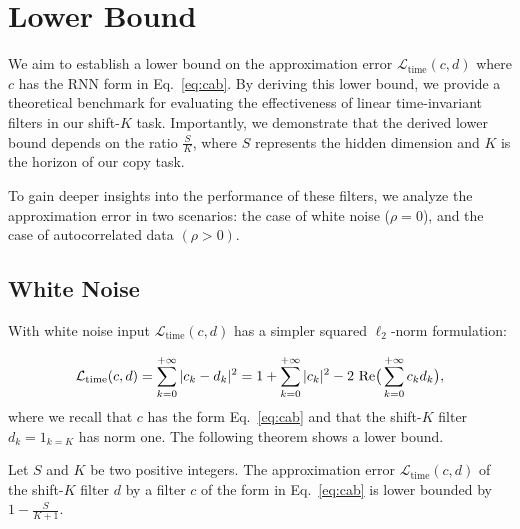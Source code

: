 \section{Lower Bound}\label{section lower bound}

We aim to establish a lower bound on the approximation error $\mathcal{L}_\text{time}(c,d)$ where $c$ has the RNN form in Eq.~\eqref{eq:cab}. By deriving this lower bound, we provide a theoretical benchmark for evaluating the effectiveness of linear time-invariant filters in our shift-$K$ task. Importantly, we demonstrate that the derived lower bound depends on the ratio \(\frac{S}{K}\), where \(S\) represents the hidden dimension and \(K\) is the horizon of our copy task.  


To gain deeper insights into the performance of these filters, we analyze the approximation error in two scenarios: the case of white noise ($\rho=0$), and the case of autocorrelated data $(\rho>0)$.

\subsection{White Noise}

With white noise input $\mathcal{L}_\text{time}(c, d)$ has a simpler squared $\ell_2$-norm formulation:

\begin{equation}
\mathcal{L}_\text{time}(c, d)= \sum_{k=0}^{+\infty}\vert c_k - d_k\vert^2 = 1 + \sum_{k=0}^{+\infty}\vert c_k\vert^2 - 2{\textnormal{ Re}}\big(\sum_{k=0}^{+\infty}c_kd_k\big),
\label{white noise time domain loss}
\end{equation}
where we recall that $c$ has the form Eq.~\eqref{eq:cab} and that the shift-$K$ filter $d_k= 1_{k=K}$ has norm one. The following theorem shows a lower bound.


\begin{theorem}\label{lower bound white noise}
 Let $S$ and $K$ be two  positive integers. The approximation error $\mathcal{L}_\text{time}(c, d)$ of the shift-$K$ filter $d$ by a filter $c$ of the form in Eq.~\eqref{eq:cab} is lower bounded by $1-\frac{S}{K+1}$.
\end{theorem}

